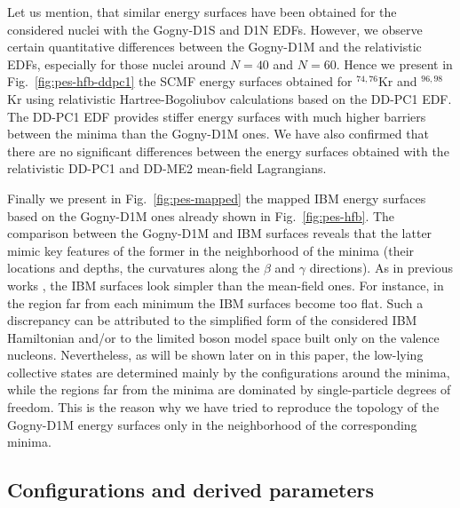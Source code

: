 \documentclass[twocolumn,showpacs,amsmath,amssymb,superscriptaddress]{revtex4-1}
\begin{document}
Let us mention, that similar energy surfaces have
been obtained for the considered nuclei
with the Gogny-D1S and D1N EDFs. However, we observe certain quantitative 
differences between the Gogny-D1M and the relativistic
EDFs, especially for those nuclei around $N=40$ and $N=60$. Hence we present 
in Fig.~\ref{fig:pes-hfb-ddpc1} the SCMF energy surfaces obtained for
$^{74,76}$Kr and $^{96,98}$Kr using  
relativistic Hartree-Bogoliubov calculations  based on the DD-PC1 EDF. 
The DD-PC1 EDF provides stiffer energy surfaces with much higher
barriers between the minima than the Gogny-D1M ones. 
We have also confirmed that there are no significant differences between the
energy surfaces obtained with the relativistic DD-PC1 and DD-ME2 mean-field
Lagrangians.



Finally we present in Fig.~\ref{fig:pes-mapped} the mapped IBM energy
surfaces based on the Gogny-D1M  ones already  shown in Fig.~\ref{fig:pes-hfb}.
The comparison between the Gogny-D1M and IBM surfaces reveals that the latter mimic 
key features of the former in 
the neighborhood of the minima (their locations and depths, the curvatures along the $\beta$ 
and $\gamma$ directions).  As in previous works \cite{nomura2016zr,nomura2017ge}, the 
IBM surfaces look simpler than the mean-field ones. For instance, in the 
region far from each minimum the IBM surfaces
become too flat. Such a discrepancy can be attributed to the 
simplified form of the considered IBM Hamiltonian and/or to the limited boson model space 
built only on the valence nucleons. Nevertheless, as will be shown later on in 
this paper, the low-lying collective states are determined mainly by
the configurations around the minima, while the regions far from the
minima are dominated by single-particle degrees of freedom. 
This is the reason why we have tried to reproduce the topology of the
Gogny-D1M energy  surfaces only in the neighborhood of the corresponding minima. 




\subsection{Configurations and derived parameters\label{sec:config}}

\end{document}
